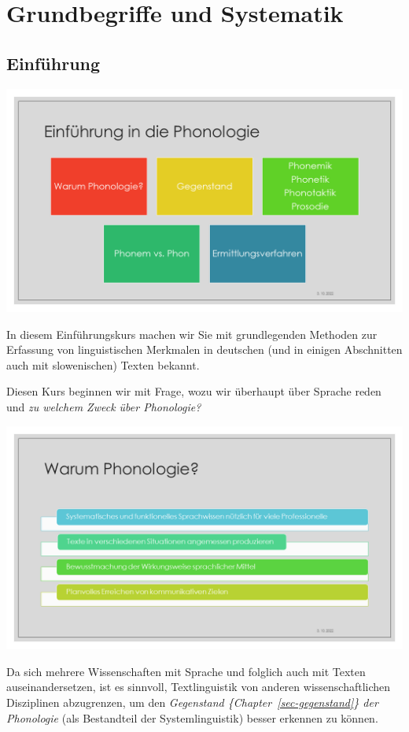 \documentclass[
  letterpaper,
]{scrbook}
\begin{document}
\part{Grundbegriffe und Systematik}

\hypertarget{sec-einfuhrung}{%
\chapter{Einführung}\label{sec-einfuhrung}}

\includegraphics[width=1\textwidth,height=\textheight]{./pictures/Diapozitiv6.PNG}

In diesem Einführungskurs machen wir Sie mit grundlegenden Methoden zur
Erfassung von linguistischen Merkmalen in deutschen (und in einigen
Abschnitten auch mit slowenischen) Texten bekannt.

Diesen Kurs beginnen wir mit Frage, wozu wir überhaupt über Sprache
reden und \emph{zu welchem Zweck über Phonologie?}

\includegraphics[width=1\textwidth,height=\textheight]{./pictures/Diapozitiv7.PNG}

Da sich mehrere Wissenschaften mit Sprache und folglich auch mit Texten
auseinandersetzen, ist es sinnvoll, Textlinguistik von anderen
wissenschaftlichen Disziplinen abzugrenzen, um den \emph{Gegenstand
\{Chapter~\ref{sec-gegenstand}\} der Phonologie} (als Bestandteil der
Systemlinguistik) besser erkennen zu können.
\end{document}
